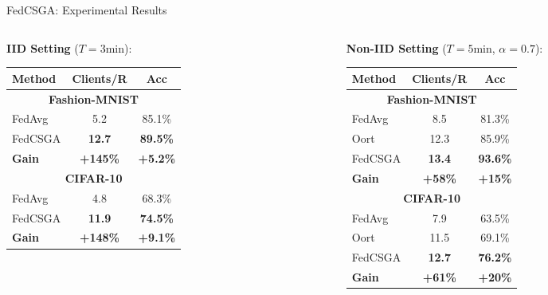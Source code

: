 \documentclass{beamer}
\begin{document}
\begin{frame}{FedCSGA: Experimental Results}
\scriptsize
\begin{columns}[T]
\begin{column}{0.48\textwidth}
\textbf{IID Setting} ($T=3$min):
\begin{table}
\centering
\tiny
\begin{tabular}{|l|c|c|}
\hline
\textbf{Method} & \textbf{Clients/R} & \textbf{Acc} \\
\hline
\multicolumn{3}{|c|}{\textbf{Fashion-MNIST}} \\
\hline
FedAvg & 5.2 & 85.1\% \\
FedCSGA & \textbf{12.7} & \textbf{89.5\%} \\
\textbf{Gain} & \textbf{+145\%} & \textbf{+5.2\%} \\
\hline
\multicolumn{3}{|c|}{\textbf{CIFAR-10}} \\
\hline
FedAvg & 4.8 & 68.3\% \\
FedCSGA & \textbf{11.9} & \textbf{74.5\%} \\
\textbf{Gain} & \textbf{+148\%} & \textbf{+9.1\%} \\
\hline
\end{tabular}
\end{table}
\end{column}

\begin{column}{0.48\textwidth}
\textbf{Non-IID Setting} ($T=5$min, $\alpha=0.7$):
\begin{table}
\centering
\tiny
\begin{tabular}{|l|c|c|}
\hline
\textbf{Method} & \textbf{Clients/R} & \textbf{Acc} \\
\hline
\multicolumn{3}{|c|}{\textbf{Fashion-MNIST}} \\
\hline
FedAvg & 8.5 & 81.3\% \\
Oort & 12.3 & 85.9\% \\
FedCSGA & \textbf{13.4} & \textbf{93.6\%} \\
\textbf{Gain} & \textbf{+58\%} & \textbf{+15\%} \\
\hline
\multicolumn{3}{|c|}{\textbf{CIFAR-10}} \\
\hline
FedAvg & 7.9 & 63.5\% \\
Oort & 11.5 & 69.1\% \\
FedCSGA & \textbf{12.7} & \textbf{76.2\%} \\
\textbf{Gain} & \textbf{+61\%} & \textbf{+20\%} \\
\hline
\end{tabular}
\end{table}
\end{column}
\end{columns}


\end{frame}
\end{document}
